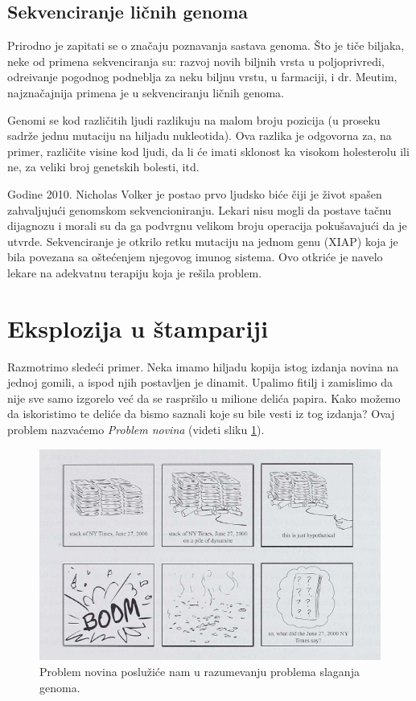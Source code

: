 \subsection{Sekvenciranje ličnih genoma}

Prirodno je zapitati se o značaju poznavanja sastava genoma. \v Sto je ti\v ce biljaka, neke od primena sekvenciranja su: razvoj novih biljnih vrsta u poljoprivredi, odre\dj ivanje pogodnog podneblja za neku biljnu vrstu, u farmaciji, i dr. Me\dj utim, najzna\v cajnija primena je u sekvenciranju li\v cnih genoma.

Genomi se kod različitih ljudi razlikuju na malom broju pozicija (u proseku sadrže jednu mutaciju na hiljadu nukleotida). Ova razlika je odgovorna za, na primer, različite visine kod ljudi, da li će imati sklonost ka visokom holesterolu ili ne, za veliki broj genetskih bolesti, itd.

Godine 2010. Nicholas Volker je postao prvo ljudsko biće čiji je život spašen zahvaljujući genomskom sekvencioniranju. Lekari nisu mogli da postave tačnu dijagnozu i morali su da ga podvrgnu velikom broju operacija pokušavajući da je utvrde. Sekvenciranje je otkrilo retku mutaciju na jednom genu (XIAP) koja je bila povezana sa oštećenjem njegovog imunog sistema. Ovo otkriće je navelo lekare na adekvatnu terapiju koja je rešila problem.

\section{Eksplozija u štampariji}

Razmotrimo slede\'ci primer. Neka imamo hiljadu kopija istog izdanja novina na jednoj gomili, a ispod njih postavljen je dinamit. Upalimo fitilj i zamislimo da nije sve samo izgorelo već da se raspršilo u milione delića papira. Kako možemo da iskoristimo te deliće da bismo saznali koje su bile vesti iz tog izdanja? Ovaj problem nazvaćemo \emph{Problem novina} (videti sliku \ref{slika:eksplozija}). 

\iffalse 
\begin{figure}[h]
	\centering
	\includegraphics[width=1\textwidth]{poglavlja/3/slike/eksplozija.png}
	\caption{Problem novina poslužiće nam u razumevanju problema slaganja genoma.}
	\label{slika:eksplozija}
\end{figure} 

